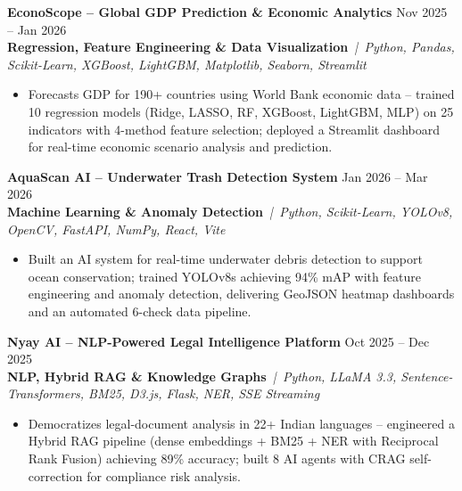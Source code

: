 \documentclass[a4paper,10pt]{article}
\newcommand{\projectEntry}[4]{%
  \vspace{1pt}%
  \noindent\textbf{\color{HeaderDark}#1} \hfill {\small\color{SubText}#2}\\[-4pt]%
  {\scriptsize\color{AccentTeal}\textbf{#3}} {\scriptsize\color{TechTag}\textit{\,|\, #4}}%
  \vspace{0pt}\par%
}
\begin{document}
\vspace{1pt}

\projectEntry{EconoScope -- Global GDP Prediction \& Economic Analytics}
  {Nov 2025 -- Jan 2026}
  {Regression, Feature Engineering \& Data Visualization}
  {Python, Pandas, Scikit-Learn, XGBoost, LightGBM, Matplotlib, Seaborn, Streamlit}

\begin{itemize}[leftmargin=14pt, itemsep=0pt, parsep=0pt, topsep=1pt, label={\color{BulletColor}\textbf{--}}]
  \item {\small Forecasts GDP for 190+ countries using World Bank economic data -- trained 10 regression models (Ridge, LASSO, RF, XGBoost, LightGBM, MLP) on 25 indicators with 4-method feature selection; deployed a Streamlit dashboard for real-time economic scenario analysis and prediction.}
\end{itemize}

\vspace{1pt}

\projectEntry{AquaScan AI -- Underwater Trash Detection System}
  {Jan 2026 -- Mar 2026}
  {Machine Learning \& Anomaly Detection}
  {Python, Scikit-Learn, YOLOv8, OpenCV, FastAPI, NumPy, React, Vite}

\begin{itemize}[leftmargin=14pt, itemsep=0pt, parsep=0pt, topsep=1pt, label={\color{BulletColor}\textbf{--}}]
  \item {\small Built an AI system for real-time underwater debris detection to support ocean conservation; trained YOLOv8s achieving 94\% mAP with feature engineering and anomaly detection, delivering GeoJSON heatmap dashboards and an automated 6-check data pipeline.}
\end{itemize}

\vspace{1pt}

\projectEntry{Nyay AI -- NLP-Powered Legal Intelligence Platform}
  {Oct 2025 -- Dec 2025}
  {NLP, Hybrid RAG \& Knowledge Graphs}
  {Python, LLaMA 3.3, Sentence-Transformers, BM25, D3.js, Flask, NER, SSE Streaming}

\begin{itemize}[leftmargin=14pt, itemsep=0pt, parsep=0pt, topsep=1pt, label={\color{BulletColor}\textbf{--}}]
  \item {\small Democratizes legal-document analysis in 22+ Indian languages -- engineered a Hybrid RAG pipeline (dense embeddings + BM25 + NER with Reciprocal Rank Fusion) achieving 89\% accuracy; built 8 AI agents with CRAG self-correction for compliance risk analysis.}
\end{itemize}
\end{document}
